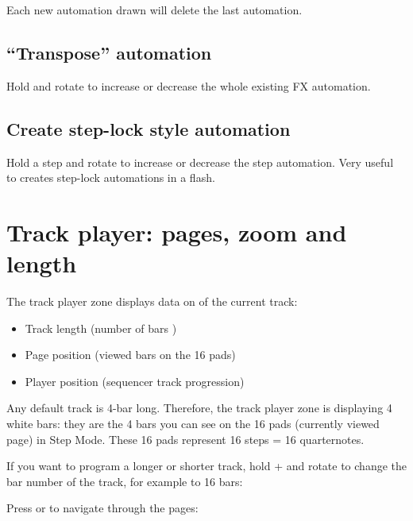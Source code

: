 Each new automation drawn will delete the last automation.

\subsection{“Transpose” automation}

Hold  and rotate \encodericon{} to increase or decrease the whole existing FX automation.

\subsection{Create step-lock style automation}

Hold a step \stepbystepicon{} and rotate \encodericon{} to increase or decrease the step automation. Very useful to creates step-lock automations in a flash.



\section{Track player: pages, zoom and length}

The track player zone displays data on of the current track:

\begin{itemize}
\item \tracklenicon{} Track length (number of bars \baricon{})
\item \pageposicon{} Page position (viewed bars on the 16 pads)
\item \playerposicon{} Player position (sequencer track progression)
\end{itemize}

Any default track is 4-bar long. Therefore, the track player zone is displaying 4 white bars: they are the 4 bars you can see on the 16 pads (currently viewed page) in Step Mode. These 16 pads represent 16 steps = 16 quarternotes.


If you want to program a longer or shorter track, hold  +  and rotate \encodericon{} to change the bar number of the track, for example to 16 bars:


Press \btn{<} or \btn{>} to navigate through the pages:


